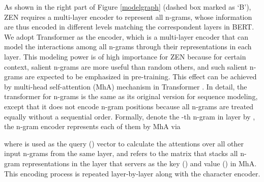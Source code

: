 \documentclass[11pt,a4paper]{article}
\begin{document}
\begin{CJK}{UTF8}{gbsn}
As shown in the right part of Figure \ref{modelgraph} (dashed box marked as `B'),
ZEN requires a multi-layer encoder
to represent all n-grams,
whose information are thus encoded in different levels
matching the correspondent layers in BERT.
We adopt Transformer \cite{vaswani2017attention} as the encoder,
which is a multi-layer encoder that can model the interactions among all n-grams through their representations in each layer.
This modeling power is of high importance for ZEN because for certain context, salient n-grams are more useful than random others,
and such salient n-grams are expected to be emphasized in pre-training.
This effect can be achieved by
multi-head self-attention (MhA) mechanism in Transformer \cite{clark2019does}.
In detail, the transformer for n-grams is the same as its original version for sequence modeling, except that it does not encode n-gram positions because all n-grams are treated equally without a sequential order.
Formally, denote the -th n-gram in layer   by ,
the n-gram encoder represents each of them 
by MhA via

where 
 is used as the query () vector to calculate the attentions over all other input n-grams from the same layer,
and  refers to the matrix that stacks all n-gram representations in the layer  that servers as the key () and value () in MhA.
This encoding process
is repeated layer-by-layer along with the character encoder.




\end{CJK}
\end{document}
